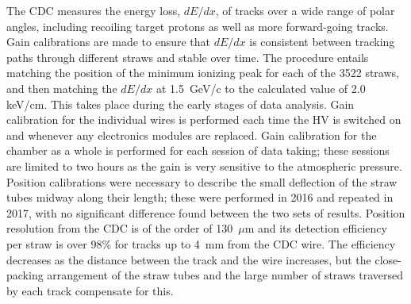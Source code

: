 The CDC measures the energy loss, $dE/dx$, of tracks over a wide range of polar angles, including recoiling target protons as well as more forward-going tracks. Gain calibrations are made to ensure that $dE/dx$ is consistent between tracking paths through different straws and stable over time. 
The procedure entails matching the position of the minimum ionizing peak for each of the 3522 straws, and then matching the $dE/dx$ at 1.5~GeV/c to the calculated value of 2.0~ keV/cm. This takes place during the early stages of data analysis. Gain calibration for the individual wires is performed each time the HV is switched on and whenever any electronics modules are replaced. Gain calibration for the chamber as a whole is performed for each session of data taking; these sessions are limited to two hours as the gain is very sensitive to the atmospheric pressure. Position calibrations were necessary to describe the small deflection of the straw tubes midway along their length; these were performed in 2016 and repeated in 2017, with no significant difference found between the two sets of results.  Position resolution from the CDC is of the order of 130~$\mu$m and its detection efficiency per straw is over 98\% for tracks up to 4~mm from the CDC wire. The efficiency decreases as the distance between the track and the wire increases, but the close-packing arrangement of the straw tubes and the large number of straws traversed by each track compensate for this. 

